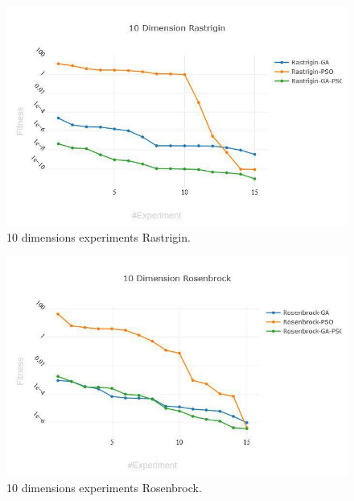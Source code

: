 \documentclass[runningheads]{llncs}
\begin{document}
        \begin{figure}[htp]
          \includegraphics[width=\textwidth]{10-rastrigin.jpg}
          \caption{10 dimensions experiments Rastrigin.} \label{fig1}
          \end{figure}

          \begin{figure}[htp]
            \includegraphics[width=\textwidth]{10-rosenbrock.jpg}
            \caption{10 dimensions experiments Rosenbrock.} \label{fig1}
            \end{figure}
\end{document}
